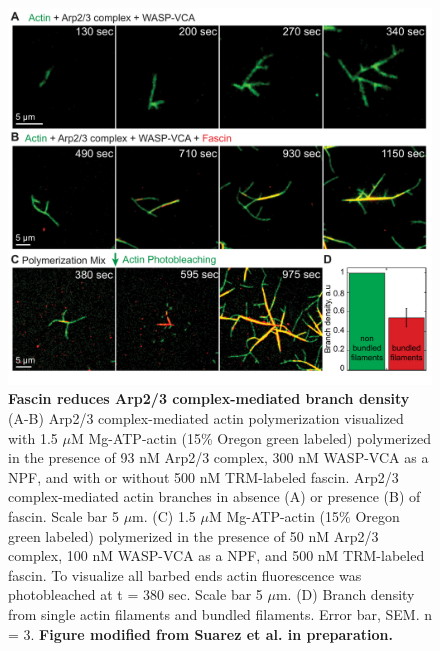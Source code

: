 \begin{figure}
\centering
\includegraphics[width=\textwidth]{img/ch03/Thesis_branching.pdf}
\caption[Fascin reduces Arp2/3 complex-mediated branch density]{\textbf{Fascin reduces Arp2/3 complex-mediated branch density} (A-B) Arp2/3 complex-mediated actin polymerization visualized with 1.5 $\mu$M Mg-ATP-actin (15\% Oregon green labeled) polymerized in the presence of 93 nM Arp2/3 complex, 300 nM WASP-VCA as a NPF, and with or without 500 nM TRM-labeled fascin. Arp2/3 complex-mediated actin branches in absence (A) or presence (B) of fascin. Scale bar 5 $\mu$m. (C) 1.5 $\mu$M Mg-ATP-actin (15\% Oregon green labeled) polymerized in the presence of 50 nM Arp2/3 complex, 100 nM WASP-VCA as a NPF, and 500 nM TRM-labeled fascin. To visualize all barbed ends actin fluorescence was photobleached at t = 380 sec. Scale bar 5 $\mu$m. (D) Branch density from single actin filaments and bundled filaments. Error bar, SEM. n = 3. \textbf{Figure modified from Suarez et al. in preparation.}}
\label{fig:fascin_branching}
\end{figure}

